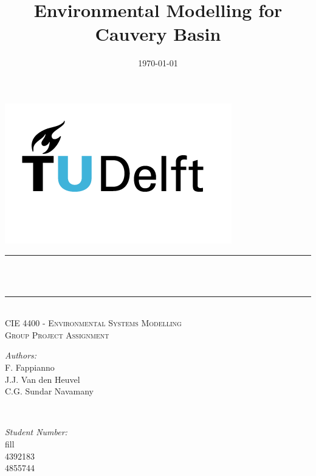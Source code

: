 \documentclass[11pt, hidelinks]{article}
\title{Environmental Modelling for Cauvery Basin}								%
\date{\today}										            	%
\makeatletter
\let\thetitle\@title
\let\theauthor\@author
\makeatother
\begin{document}
\setlength{\parindent}{0cm}



\begin{titlepage}
	\centering
    \vspace*{0.5 cm}
    \includegraphics[scale = 1]{Images/Front_page/TUDelft.png}	%
    \textsc{\LARGE }\\	%
    
	\rule{\linewidth}{0.2 mm} \\[0.4 cm]
	{ \huge \bfseries \thetitle}\\
	\rule{\linewidth}{0.2 mm} \\[1.0 cm]
	
	\textsc{\Large CIE 4400 - Environmental Systems Modelling}\\[1 cm]
	\textsc{\Large Group Project Assignment}\\[1 cm]
	\begin{minipage}{0.4\textwidth}
		\begin{flushleft} \large
			\emph{Authors:}\\
            F. Fappianno \\
            J.J. Van den Heuvel \\
            C.G. Sundar Navamany \\
            
           
			\end{flushleft}
			\end{minipage}~
			\begin{minipage}{0.4\textwidth}
			\begin{flushright} \large
			\emph{Student Number:} \\
		    fill\\
            4392183\\
			4855744\\
			

\end{flushright}
\end{minipage}
\end{titlepage}
\end{document}
